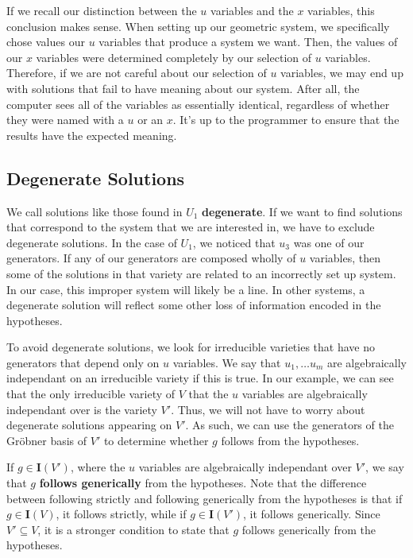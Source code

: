 \documentclass[12pt]{article}
\theoremstyle{plain}
\theoremstyle{definition}
\theoremstyle{remark}
\newcommand{\gro}{Gr\"obner }
\begin{document}
If we recall our distinction between the $u$ variables and the $x$ variables, this conclusion makes sense.
When setting up our geometric system, we specifically chose values our $u$ variables that produce a system we want. 
Then, the values of our $x$ variables were determined completely by our selection of $u$ variables.
Therefore, if we are not careful about our selection of $u$ variables, we may end up with solutions that fail to have meaning about our system.
After all, the computer sees all of the variables as essentially identical, regardless of whether they were named with a $u$ or an $x$. 
It's up to the programmer to ensure that the results have the expected meaning.

\subsection{Degenerate Solutions}

We call solutions like those found in $U_1$ \textbf{degenerate}. If we want to find solutions that correspond to the system that we are interested in, we have to exclude degenerate solutions.
In the case of $U_1$, we noticed that $u_3$ was one of our generators. 
If any of our generators are composed wholly of $u$ variables, then some of the solutions in that variety are related to an incorrectly set up system.
In our case, this improper system will likely be a line.
In other systems, a degenerate solution will reflect some other loss of information encoded in the hypotheses.

To avoid degenerate solutions, we look for irreducible varieties that have no generators that depend only on $u$ variables. 
We say that $u_1,\dots u_m$ are algebraically independant on an irreducible variety if this is true.
In our example, we can see that the only irreducible variety of $V$ that the $u$ variables are algebraically independant over is the variety $V'$.
Thus, we will not have to worry about degenerate solutions appearing on $V'$. 
As such, we can use the generators of the \gro basis of $V'$ to determine whether $g$ follows from the hypotheses.

If $g \in \textbf{I}(V')$, where the $u$ variables are algebraically independant over $V'$, we say that $g$ \textbf{follows generically} from the hypotheses.
Note that the difference between following strictly and following generically from the hypotheses is that if $g \in \textbf{I}(V)$, it follows strictly, 
while if $g \in \textbf{I}(V')$, it follows generically.
Since $V' \subseteq V$, it is a stronger condition to state that $g$ follows generically from the hypotheses.
\end{document}
